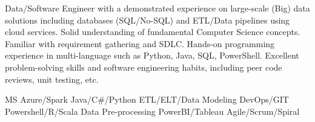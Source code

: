 \documentclass[a4paper]{ReadableCV}
\begin{document}
	






\showHeader



Data/Software Engineer with a demonstrated experience on large-scale (Big) data solutions including databases (SQL/No-SQL) and ETL/Data pipelines using cloud services. Solid understanding of fundamental Computer Science concepts. Familiar with requirement gathering and SDLC. Hands-on programming experience in multi-language such as Python, Java, SQL, PowerShell. Excellent problem-solving skills and software engineering habits, including peer code reviews, unit testing, etc.


	      {MS Azure/Spark}
		  {Java/C\#/Python}
		  {ETL/ELT/Data Modeling}
		  {DevOps/GIT}
		  {Powershell/R/Scala}
		  {Data Pre-processing}
		  {PowerBI/Tableau}
		  {Agile/Scrum/Spiral}
		  

\end{document}
